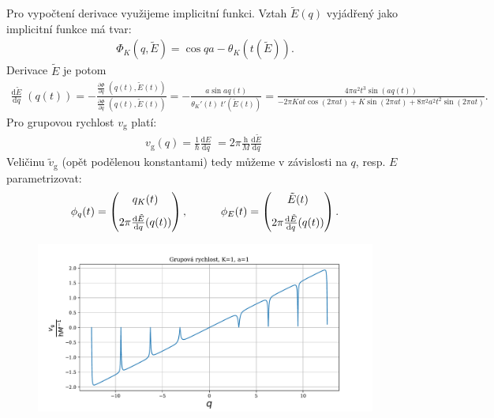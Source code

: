 \documentclass[10pt,a4paper]{article}
\newcommand{\const}[1]{\text{#1}}
\newcommand{\mat}[1]{
    \begin{pmatrix}
        #1
    \end{pmatrix}
}
\newcommand{\dd}[2]{\frac{\const{d} #1}{\const{d} #2} \;}
\newcommand{\pd}[2]{\frac{\partial  #1}{\partial  #2} \;}
\begin{document}
Pro vypočtení derivace využijeme implicitní funkci. Vztah $\tilde{E}(q)$ vyjádřený jako implicitní funkce má tvar:
\begin{gather*}
    \Phi_K(q, \tilde{E}) =
    \cos{qa} - \theta_K(t(\tilde{E})).
\end{gather*}
Derivace $\tilde{E}$ je potom
\begin{gather*}
    \dd{\tilde{E}}{q}(q(t)) =
    - \frac{\pd{\Phi}{q}(q(t), \tilde{E}(t))}{\pd{\Phi}{q}(q(t), \tilde{E}(t))} =
    - \frac{a \sin aq(t)}{\theta_K'(t) \; t'(\tilde{E}(t))}
    = \frac{4 \pi a^{2} t^{3} \sin{\left(a q(t) \right)}}{- 2 \pi K a t \cos{\left(2 \pi a t \right)} + K \sin{\left(2 \pi a t \right)} + 8 \pi^{2} a^{2} t^{2} \sin{\left(2 \pi a t \right)}}.
\end{gather*}
Pro grupovou rychlost $v_\const{g}$ platí:
\begin{gather*}
    v_\const{g}(q) = \frac{1}{\hbar} \dd{E}{q} = 2 \pi \frac{\const{h}}{M} \dd{\tilde{E}}{q}
\end{gather*}
Veličinu $\tilde{v}_\const{g}$ (opět podělenou konstantami) tedy můžeme v závislosti na $q$, resp. $E$ parametrizovat:
\begin{gather*}
    \phi_q(t) = \mat{
        q_K(t) \\[7pt]
        2 \pi \dd{\tilde{E}}{q}\hspace{-3pt}(q(t))
    },
    \hspace{3em}
    \phi_E(t) = \mat{
        \tilde{E}(t) \\[7pt]
        2 \pi \dd{\tilde{E}}{q}\hspace{-3pt}(q(t))
    }.
\end{gather*}
\begin{figure}[h!]
    \centering
    \includegraphics[scale=0.65]{grupova1_q.pdf}
    \label{}
\end{figure}
\end{document}
